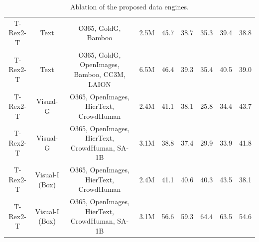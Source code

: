 \begin{table}[h]
{\begin{tabular}{cc|c|l|c|cccc}
T-Rex2-T               & Text                                                                   & O365, GoldG, Bamboo                                                      & 2.5M                                                                 & 45.7                                                         & 38.7           & 35.3            & 39.4          & 38.8                              \\
T-Rex2-T               & Text                                                                   & O365, GoldG, OpenImages, Bamboo, CC3M, LAION                             & 6.5M                                                                 & 46.4                                                         & 39.3           & 35.4            & 40.5          & 39.0                              \\ \hline
T-Rex2-T               & Visual-G                                                               & O365, OpenImages, HierText, CrowdHuman                                   & \multicolumn{1}{c|}{2.4M}                                            & 41.1                                                            & 38.1              & 25.8               & 34.4             & 43.7                                 \\
T-Rex2-T               & Visual-G                                                               & O365, OpenImages, HierText, CrowdHuman, SA-1B                            & \multicolumn{1}{c|}{3.1M}                                            & 38.8                                                         & 37.4           & 29.9            & 33.9          & 41.8                              \\ \hline
T-Rex2-T               & Visual-I (Box)                                                         & O365, OpenImages, HierText, CrowdHuman                                   & \multicolumn{1}{c|}{2.4M}                                            & 41.1                                                         & 40.6           & 40.3            & 43.5          & \multicolumn{1}{l}{38.1}          \\
T-Rex2-T               & Visual-I (Box)                                                         & O365, OpenImages, HierText, CrowdHuman, SA-1B                            & \multicolumn{1}{c|}{3.1M}                                            & 56.6                                                         & 59.3           & 64.4            & 63.5          & \multicolumn{1}{l}{54.6}          \\ \hline
\end{tabular}}
    \caption{Ablation of the proposed data engines.}
    \label{tab:data_engine}
    \end{table}

